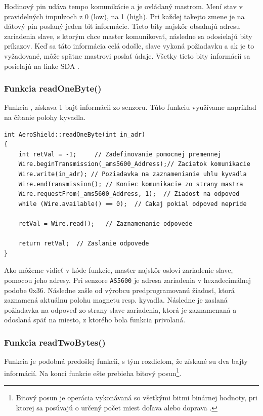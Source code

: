 Hodinový pin udáva tempo komunikácie a je ovládaný mastrom. Mení stav v pravidelných impulzoch z 0 (low), na 1 (high). Pri každej takejto zmene je na dátový pin poslaný jeden bit informácie. Tieto bity najskôr obsahujú adresu zariadenia slave, s ktorým chce master komunikovať, následne sa odosielajú bity príkazov. Keď sa táto informácia celá odošle, slave vykoná požiadavku a ak je to vyžadované, môže spätne mastrovi poslať údaje. Všetky tieto bity informácií sa posielajú na linke SDA \cite{idvac}.

   

\subsubsection{Funkcia readOneByte()}

 Funkcia , získava 1 bajt informácii zo senzoru. Túto funkciu využívame napríklad na čítanie polohy kyvadla. 

\begin{lstlisting}[caption={Zdrojový kód funkcie readOneByte.},captionpos=b]
int AeroShield::readOneByte(int in_adr)         
{
	int retVal = -1;	 // Zadefinovanie pomocnej premennej
	Wire.beginTransmission(_ams5600_Address);// Zaciatok komunikacie 
	Wire.write(in_adr);	// Poziadavka na zaznamenianie uhlu kyvadla 
	Wire.endTransmission();	// Koniec komunikacie zo strany mastra
	Wire.requestFrom(_ams5600_Address, 1);	// Ziadost na odpoved  
	while (Wire.available() == 0);	// Cakaj pokial odpoved nepride  
	
	retVal = Wire.read();	// Zaznamenanie odpovede 
	
	return retVal;	// Zaslanie odpovede 
}
\end{lstlisting}

Ako môžeme vidieť v kóde funkcie, master najskôr osloví zariadenie slave, pomocou jeho adresy. Pri senzore \verb|AS5600| je adresa zariadenia v hexadecimálnej podobe 0x36. Následne zašle od výrobcu predprogramovanú žiadosť, ktorá zaznamená aktuálnu polohu magnetu resp. kyvadla. Následne je zaslaná požiadavka na odpoveď zo strany slave zariadenia, ktorá je zaznamenaná a odoslaná späť na miesto, z ktorého bola funkcia privolaná.

\subsubsection{Funkcia readTwoBytes()}

Funkcia  je podobná predošlej funkcii, s tým rozdielom, že získané su dva bajty informácií. Na konci funkcie ešte prebieha bitový posun\footnote[6]{Bitový posun je operácia vykonávaná so všetkými bitmi binárnej hodnoty, pri ktorej sa posúvajú o určený počet miest doľava alebo doprava \cite{biteShift}.}. 

